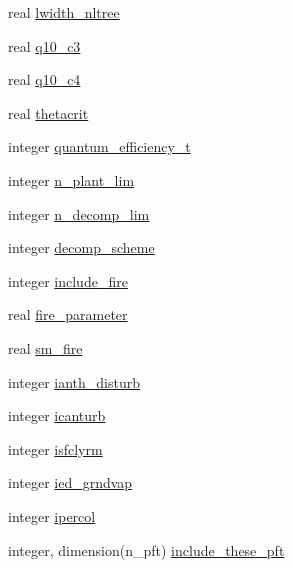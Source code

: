 \begin{DoxyCompactItemize}
\item 
real \hyperlink{structename__coms_1_1ename__vars_a5f2ed244b34b149113ed4fa361debb5c}{lwidth\+\_\+nltree}
\item 
real \hyperlink{structename__coms_1_1ename__vars_a05df3f3fa31a41ce152ee67cc6a6b05f}{q10\+\_\+c3}
\item 
real \hyperlink{structename__coms_1_1ename__vars_a668429a0b249ac68b8862593ad170f18}{q10\+\_\+c4}
\item 
real \hyperlink{structename__coms_1_1ename__vars_af1ae876f6fd3bc5fe5bcb0224c5e075c}{thetacrit}
\item 
integer \hyperlink{structename__coms_1_1ename__vars_abc17652e52636944b264f4d360991369}{quantum\+\_\+efficiency\+\_\+t}
\item 
integer \hyperlink{structename__coms_1_1ename__vars_aae19392e8d873f00b632fac383dba2f6}{n\+\_\+plant\+\_\+lim}
\item 
integer \hyperlink{structename__coms_1_1ename__vars_a2b597d5e16a9bdbbf5adb01cba2735d8}{n\+\_\+decomp\+\_\+lim}
\item 
integer \hyperlink{structename__coms_1_1ename__vars_a909bb2f7741a968ef768f714570fb5d0}{decomp\+\_\+scheme}
\item 
integer \hyperlink{structename__coms_1_1ename__vars_a5f358fe88bb2b9dc160d193adec5a09b}{include\+\_\+fire}
\item 
real \hyperlink{structename__coms_1_1ename__vars_a0831ab587bf2c0ec6fb379c0710ae8c2}{fire\+\_\+parameter}
\item 
real \hyperlink{structename__coms_1_1ename__vars_a14c833ccd73674a103a9163c607420cc}{sm\+\_\+fire}
\item 
integer \hyperlink{structename__coms_1_1ename__vars_a6d60cf5c6ad5d3a2118adb39e0d56702}{ianth\+\_\+disturb}
\item 
integer \hyperlink{structename__coms_1_1ename__vars_ab4714df83ca3c2287d90a37ecad70224}{icanturb}
\item 
integer \hyperlink{structename__coms_1_1ename__vars_a1377d0f7585ac7ad79a339e984ceae8f}{isfclyrm}
\item 
integer \hyperlink{structename__coms_1_1ename__vars_a8581155b5265ff836367e5df3df4275c}{ied\+\_\+grndvap}
\item 
integer \hyperlink{structename__coms_1_1ename__vars_a58d5105fef5f1529ef1d031b20995147}{ipercol}
\item 
integer, dimension(n\+\_\+pft) \hyperlink{structename__coms_1_1ename__vars_aedaaec76f0808b6f603014d849294a5f}{include\+\_\+these\+\_\+pft}
\item 

\end{DoxyCompactItemize}

